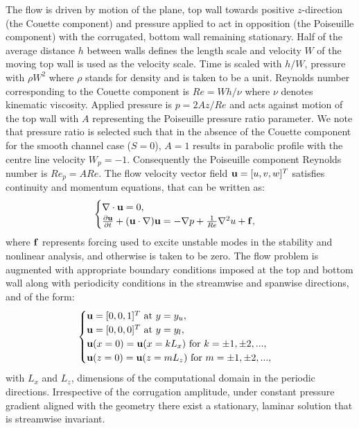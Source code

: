\documentclass[lineno]{jfm}
\begin{document}
The flow is driven by motion of the plane, top wall towards positive $z$-direction (the Couette component) and pressure applied to act in opposition (the Poiseuille component) with the corrugated, bottom wall remaining stationary.
Half of the average distance $h$ between walls defines the length scale and velocity $W$ of the moving top wall is used as the velocity scale.
Time is scaled with ${h}/{W}$, pressure with $\rho W^2$ where $\rho$ stands for density and is taken to be a unit.
Reynolds number corresponding to the Couette component is $Re={W h}/{\nu}$ where $\nu$ denotes kinematic viscosity.
Applied pressure is $p=2A z/Re$ and acts against motion of the top wall with $A$ representing the Poiseuille pressure ratio parameter.
We note that pressure ratio is selected such that in the absence of the Couette component for the smooth channel case ($S=0$), $A=1$ results in parabolic profile with the centre line velocity $W_p=-1$.
Consequently the Poiseuille component Reynolds number is $Re_p=A Re$.
The flow velocity vector field ${\bf u}=[u, v, w]^T$ satisfies continuity and momentum equations, that can be written as:
\begin{equation}
\begin{cases}
\nabla \cdot {\bf u} = 0,\\
\frac{\partial {\bf u}}{\partial t} + ({\bf u} \cdot \nabla){\bf u} = -\nabla p + \frac{1}{Re} \nabla^2 u + {\bf f},\\
\end{cases}
\label{eq:NS}
\end{equation}
where $\bf f$ represents  forcing used to excite
unstable modes in the stability and nonlinear analysis, and otherwise is taken to be zero.
The flow problem is augmented with appropriate boundary conditions imposed at the top and bottom wall
along with periodicity conditions in the streamwise and spanwise directions,
and of the form:
\begin{equation}
\begin{cases}
{\bf u} = [0, 0, 1]^T\text{ at } y=y_{u},\\
{\bf u} = [0, 0, 0]^T \text{ at } y=y_{l},\\
{\bf u}(x=0)={\bf u}(x=kL_x) \text{ for } k=\pm1,\pm2, \text{...},\\
{\bf u}(z=0)={\bf u}(z=mL_z) \text{ for } m=\pm1,\pm2, \text{...},
\end{cases}
\end{equation}
with $L_x$ and $L_z$, dimensions of the computational domain in the periodic directions.
Irrespective of the corrugation amplitude, under constant pressure gradient aligned with the geometry there exist a stationary, laminar solution that is streamwise invariant.
\end{document}
